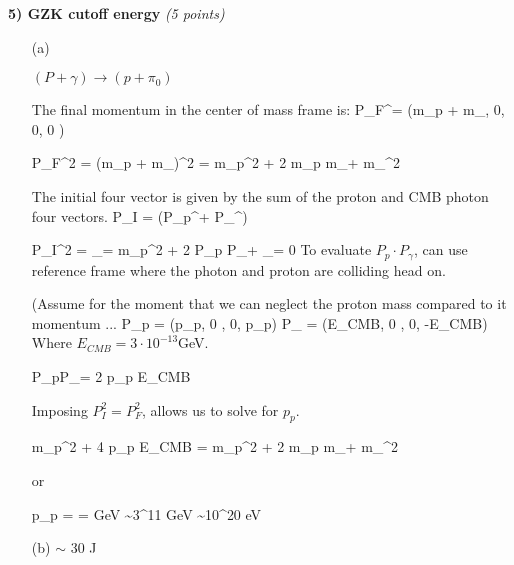 \vspace*{0.25in}

\textbf{5)  GZK cutoff energy} \hfill \textit{(5 points)}
\begin{itemize}
\item[(a)]{
$(P+\gamma) \rightarrow (p + \pi_0)$

The final momentum in the center of mass frame is:
\be
P_{F}^\mu = (m_p + m_\pi, 0, 0, 0 )
\ee

\be
P_{F}^2 = (m_p + m_\pi)^2 = m_p^2 + 2 m_p  m_\pi + m_\pi^2
\ee

The initial four vector is given by the sum of the proton and CMB photon four vectors.
\be
P_{I} = (P_p^\mu + P_\gamma^\mu)
\ee

\be
P_{I}^2 = _{= m_p^2} + 2 P_p \cdot P_\gamma + _{= 0}
\ee
To evaluate $P_p \cdot P_\gamma$, can use reference frame where the photon and proton are colliding head on.

(Assume for the moment that we can neglect the proton mass compared to it momentum ...
\be
P_{p} = (p_p, 0 , 0, p_p)  \hspace{0.4in} P_{\gamma} = (E_{CMB}, 0 , 0, -E_{CMB})
\ee
Where $E_{CMB} = 3 \cdot 10^{-13} $GeV.

\be
P_p\cdot P_\gamma = 2 p_p E_{CMB} 
\ee

Imposing $P_I^2 = P_F^2$, allows us to solve for $p_p$.

\be
m_p^2 + 4 p_p E_{CMB}  = m_p^2 + 2 m_p  m_\pi + m_\pi^2
\ee

or

\be
p_p =  =  \textrm{GeV} \sim 3^{11} \textrm{GeV} \sim 10^{20} \textrm{eV}
\ee


}
\item[(b)]{
$\sim$ 30 J
}

\end{itemize}




